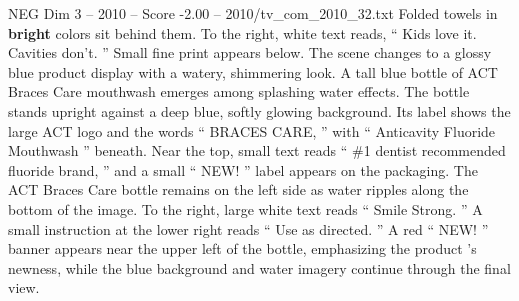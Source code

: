 \begin{textsample}{NEG Dim 3 – 2010 – Score -2.00 – 2010/tv\_com\_2010\_32.txt}
Folded towels in \textbf{bright} colors sit behind them.
To the right, white text reads, “ Kids love it.
Cavities don't. ” Small fine print appears below.
The scene changes to a glossy blue product display with a watery, shimmering look.
A tall blue bottle of ACT Braces Care mouthwash emerges among splashing water effects.
The bottle stands upright against a deep blue, softly glowing background.
Its label shows the large ACT logo and the words “ BRACES CARE, ” with “ Anticavity Fluoride Mouthwash ” beneath.
Near the top, small text reads “ \#1 dentist recommended fluoride brand, ” and a small “ NEW! ” label appears on the packaging.
The ACT Braces Care bottle remains on the left side as water ripples along the bottom of the image.
To the right, large white text reads “ Smile Strong. ” A small instruction at the lower right reads “ Use as directed. ” A red “ NEW! ” banner appears near the upper left of the bottle, emphasizing the product ’s newness, while the blue background and water imagery continue through the final view.

\end{textsample}
